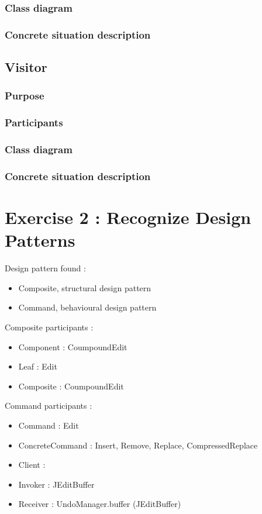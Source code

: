 \documentclass[a4paper,10pt]{article}
\begin{document}
\subsubsection{Class diagram}

\subsubsection{Concrete situation description}


\subsection{Visitor}

\subsubsection{Purpose}

\subsubsection{Participants}

\subsubsection{Class diagram}

\subsubsection{Concrete situation description}


\section{Exercise 2 : Recognize Design Patterns}
Design pattern found :
\begin{itemize}
\item Composite, structural design pattern
\item Command, behavioural design pattern
\end{itemize}
Composite participants :
\begin{itemize}
\item Component : CoumpoundEdit
\item Leaf : Edit
\item Composite : CoumpoundEdit
\end{itemize}
Command participants :
\begin{itemize}
\item Command : Edit
\item ConcreteCommand : Insert, Remove, Replace, CompressedReplace
\item Client :
\item Invoker : JEditBuffer
\item Receiver : UndoManager.buffer (JEditBuffer)
\end{itemize}
\end{document}

